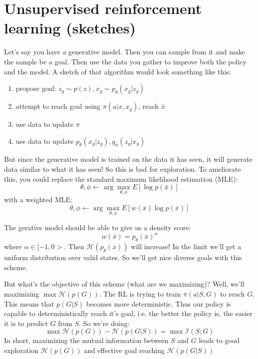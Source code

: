 \documentclass{report}
\newcommand{\argmax}{\arg\!\max}
\begin{document}
\chapter{Unsupervised reinforcement learning (sketches)}
Let's say you have a generative model. Then
you can sample from it and make the sample be a goal.
Then use the data you gather to improve both the policy and the model.
A sketch of that algorithm would look something like this:
\begin{enumerate}
		\item propose goal: $ z_g \sim p(z), x_g \sim p_\theta (x_g|z_g)  $
		\item attempt to reach goal using $ \pi(a|x,x_g)  $, reach $ \bar{x}  $
		\item use data to update $ \pi  $
		\item use data to update $ p_\theta(x_g|z_g), q_\phi(z_g|x_g)  $
\end{enumerate}

But since the generative model is trained on the data it has seen,
it will generate data similar to what it has seen!
So this is bad for exploration.
To ameliorate this, you could replace the standard maximum likelihood estimation (MLE):
\begin{equation}
		\theta, \phi \leftarrow \argmax_{\theta, \phi} E \left[ \log p(\bar{x}) \right] 
\end{equation}
with a weighted MLE:
\begin{equation}
		\theta, \phi \leftarrow \argmax_{\theta, \phi} E \left[ w(\bar{x}) \log p(\bar{x}) \right] 
\end{equation}

The gerative model should be able to give us a density score:
\begin{equation}
		w(\bar{x}) = p_\theta(\bar{x})^\alpha
\end{equation}
where $ \alpha \in [-1,0>  $.
Then $ \mathcal{H}(p_\theta(x))  $ will increase!
In the limit we'll get a uniform distribution over valid states.
So we'll get nice diverse goals with this scheme.

But what's the objective of this scheme (what are we maximizing)?
Well, we'll maximizing $ \max \mathcal{H}(p(G))  $.
The RL is trying to train $ \pi(a|S,G)  $ to reach $ G  $.
This means that $ p(G|S)  $ becomes more deterministic.
Thus our policy is capable to deterministically reach it's goal,
i.e. the better the policy is, the easier it is to predict $G$ from $S$.
So we're doing:
\begin{equation}
		\max \mathcal{H}(p(G)) - \mathcal{H}(p(G|S)) = \max \mathcal{I}(S;G)
\end{equation}
In short, maximizing the mutual information between $ S  $ and $ G  $ leads to
good exploration $ \mathcal{H}(p(G))  $ and effective goal reaching $\mathcal{H}(p(G|S))  $
\end{document}
